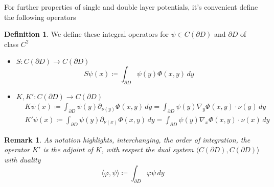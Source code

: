 \documentclass[10pt, a4paper, twoside, openright]{book}
\theoremstyle{definition}
\newtheorem{definition}[subsection]{Definition}
\theoremstyle{plain}
\theoremstyle{plain}
\theoremstyle{plain}
\theoremstyle{plain}
\newtheorem{remark}[subsection]{Remark}
\theoremstyle{plain}
\theoremstyle{plain}
\theoremstyle{plain}
\theoremstyle{plain}
\let\phi\varphi
\begin{document}
For further properties of single and double layer potentials, it's convenient define the following operators
\begin{definition}
 We define these integral operators for $\psi\in C(\partial D)$ and $\partial D$ of class $C^2$
 \begin{itemize}
  \item  $ S: C(\partial D) \to C(\partial D)$
  \begin{equation}
  S\psi(x)\coloneqq\int_{\partial D}\psi(y) \Phi(x,y)\,dy\label{def:operator-S}
  \end{equation}
  \item  $ K,K':C(\partial D) \to C(\partial D)$
  \begin{align}
  & K\psi(x)\coloneqq\int_{\partial D} \psi(y) \partial_{\nu(y)} \Phi(x, y) \,dy =\int_{\partial D} \psi(y) \nabla_y\Phi(x, y)\cdot\nu(y) \,dy\label{def:operator-K}\\
  & K'\psi(x)\coloneqq\int_{\partial D} \psi(y) \partial_{\nu(x)} \Phi(x, y) \,dy =\int_{\partial D} \psi(y) \nabla_x\Phi(x, y)\cdot\nu(x) \,dy\label{def:operator-K'}
  \end{align}
 \end{itemize}
\end{definition}
\begin{remark}
 As notation highlights, interchanging, the order of integration, the operator $K'$ is the adjoint of $K$, with respect the dual system $\langle C(\partial D), C(\partial D)\rangle$ with duality
 \begin{equation}
  \langle\phi,\psi\rangle\coloneqq\int_{\partial D}\phi\psi\,dy
 \end{equation}
\end{remark}
\end{document}
